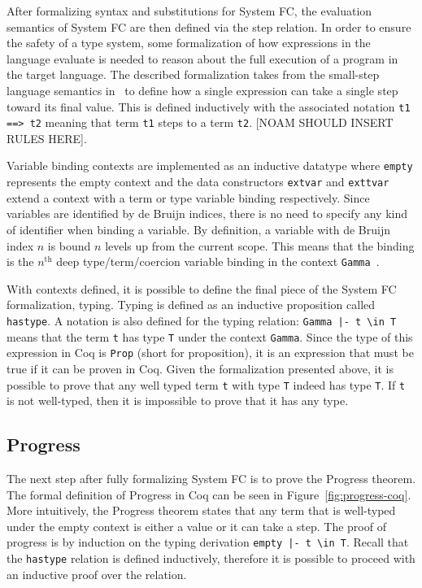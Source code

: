 \documentclass{sig-alternate}
\begin{document}
After formalizing syntax and substitutions for System FC, the evaluation semantics of System FC are then defined via the step relation. In order to ensure the safety of a type system, some formalization of how expressions in the language evaluate is needed to reason about the full execution of a program in the target language. The described formalization takes from the small-step language semantics in~\cite{Pierce:SF} to define how a single expression can take a single step toward its final value. This is defined inductively with the associated notation \texttt{t1 ==> t2} meaning that term \texttt{t1} steps to a term \texttt{t2}. [NOAM SHOULD INSERT RULES HERE].

Variable binding contexts are implemented as an inductive datatype where \texttt{empty} represents the empty context and the data constructors \texttt{ext\textunderscore var} and \texttt{ext\textunderscore tvar} extend a context with a term or type variable binding respectively. Since variables are identified by de Bruijn indices, there is no need to specify any kind of identifier when binding a variable. By definition, a variable with de Bruijn index $n$ is bound $n$ levels up from the current scope. This means that the binding is the $n^\text{th}$ deep type/term/coercion variable binding in the context \texttt{Gamma}~\cite{Vouillon12}.

With contexts defined, it is possible to define the final piece of the System FC formalization, typing. Typing is defined as an inductive proposition called \texttt{has\textunderscore type}. A notation is also defined for the typing relation: \texttt{Gamma |- t \textbackslash in T} means that the term \texttt{t} has type \texttt{T} under the context \texttt{Gamma}. Since the type of this expression in Coq is \texttt{Prop} (short for proposition), it is an expression that must be true if it can be proven in Coq. Given the formalization presented above, it is possible to prove that any well typed term \texttt{t} with type \texttt{T} indeed has type \texttt{T}. If \texttt{t} is not well-typed, then it is impossible to prove that it has any type.

\subsection{Progress}
\label{sec:implementation-progress}

The next step after fully formalizing System FC is to prove the Progress theorem. The formal definition of Progress in Coq can be seen in Figure~\ref{fig:progress-coq}. More intuitively, the Progress theorem states that any term that is well-typed under the empty context is either a value or it can take a step. The proof of progress is by induction on the typing derivation \texttt{empty |- t \textbackslash in T}. Recall that the \texttt{has\textunderscore type} relation is defined inductively, therefore it is possible to proceed with an inductive proof over the relation.
\end{document}
